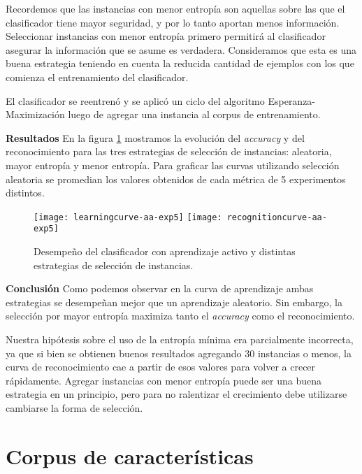Recordemos que las instancias con menor entropía son aquellas sobre las que el clasificador tiene mayor seguridad, y por lo tanto aportan menos información. Seleccionar instancias con menor entropía primero permitirá al clasificador asegurar la información que se asume es verdadera. Consideramos que esta es una buena estrategia teniendo en cuenta la reducida cantidad de ejemplos con los que comienza el entrenamiento del clasificador.

El clasificador se reentrenó y se aplicó un ciclo del algoritmo Esperanza-Maximización luego de agregar una instancia al corpus de entrenamiento.

\vspace{3 mm}

\textbf{Resultados} En la figura \ref{fig-aa-comparision} mostramos la evolución del \textit{accuracy} y del reconocimiento para las tres estrategias de selección de instancias: aleatoria, mayor entropía y menor entropía. Para graficar las curvas utilizando selección aleatoria se promedian los valores obtenidos de cada métrica de 5 experimentos distintos.

\begin{figure}[h!]\label{fig-aa-comparision}
\centering
\texttt{[image: learningcurve-aa-exp5]}
\texttt{[image: recognitioncurve-aa-exp5]}
\caption{Desempeño del clasificador con aprendizaje activo y distintas estrategias de selección de instancias.}
\end{figure}

\vspace{3 mm}

\textbf{Conclusión}
Como podemos observar en la curva de aprendizaje ambas estrategias se desempeñan mejor que un aprendizaje aleatorio. Sin embargo, la selección por mayor entropía maximiza tanto el \textit{accuracy} como el reconocimiento.

Nuestra hipótesis sobre el uso de la entropía mínima era parcialmente incorrecta, ya que si bien se obtienen buenos resultados agregando 30 instancias o menos, la curva de reconocimiento cae a partir de esos valores para volver a crecer rápidamente. Agregar instancias con menor entropía puede ser una buena estrategia en un principio, pero para no ralentizar el crecimiento debe utilizarse cambiarse la forma de selección.

\section{Corpus de características}

